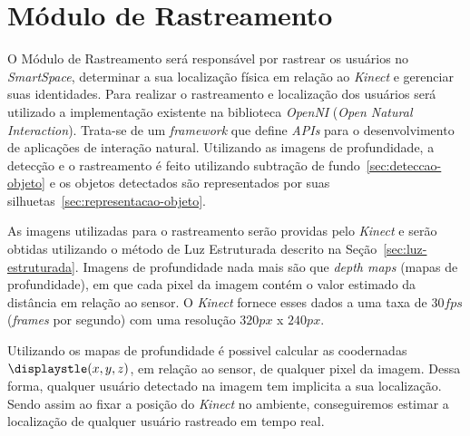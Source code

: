 \section{Módulo de Rastreamento}

	O Módulo de Rastreamento será responsável por rastrear os usuários no
	\textit{SmartSpace}, determinar a sua localização física em relação
	ao \textit{Kinect} e gerenciar suas identidades. Para realizar o rastreamento e
	localização dos usuários será utilizado a implementação existente na
	biblioteca \textit{OpenNI} (\textit{Open Natural Interaction}). Trata-se de um
	\textit{framework} que define \textit{APIs} para o desenvolvimento de
	aplicações de interação natural. Utilizando as imagens de
	profundidade, a detecção e o rastreamento é feito utilizando
	subtração de fundo~\ref{sec:deteccao-objeto} e os objetos detectados são
	representados por suas silhuetas~\ref{sec:representacao-objeto}.

	As imagens utilizadas para o rastreamento serão providas pelo \textit{Kinect} 
	e serão obtidas utilizando o método de Luz Estruturada descrito na
	Seção~\ref{sec:luz-estruturada}. Imagens de profundidade nada mais são que
	\textit{depth maps} (mapas de profundidade), em que cada pixel da imagem
	contém o valor estimado da distância em relação ao sensor. O \textit{Kinect}
	fornece esses dados a uma taxa de $\displaystyle 30 fps$ (\textit{frames} por
	segundo) com uma resolução $\displaystyle 320px$ x $\displaystyle 240px$.
	
	Utilizando os mapas de profundidade é possivel calcular as coodernadas
	$\displaystle (x,y,z)$, em relação ao sensor, de qualquer pixel da imagem.
	Dessa forma, qualquer usuário detectado na imagem tem implicita a sua
	localização. Sendo assim ao fixar a posição do \textit{Kinect} no
	ambiente, conseguiremos estimar a localização de qualquer usuário rastreado em
	tempo real.
	
